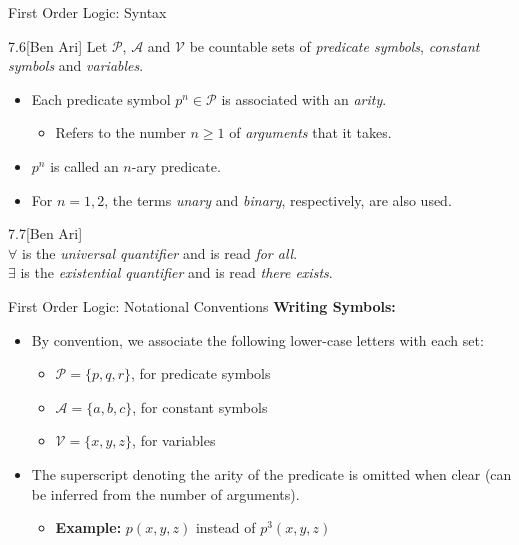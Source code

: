 \begin{slide}[bm=,toc=]{First Order Logic: Syntax}
\begin{defn}{7.6}[Ben Ari]
Let $\mathcal{P}$, $\mathcal{A}$ and $\mathcal{V}$ be countable sets of
\emph{predicate symbols}, \emph{constant symbols} and \emph{variables}.
\pause
\begin{itemize}
\item Each predicate symbol $p^n \in \mathcal{P}$ is associated with an \emph{arity}.
\begin{itemize}
\item Refers to the number $n \geq 1$ of \emph{arguments} that it takes. 
\end{itemize}
\item $p^n$ is called an $n$-ary predicate. 
\item For $n = 1,2$, the terms \emph{unary} and \emph{binary},
respectively, are also used.
\end{itemize}
\end{defn}
\pause
\begin{defn}{7.7}[Ben Ari]
~\\
$\forall$ is the \emph{universal quantifier} and is read \emph{for all}.\\
$\exists$ is the \emph{existential quantifier} and is read \emph{there exists}.
\end{defn}

\end{slide}

\begin{slide}[bm=,toc=]{First Order Logic: Notational Conventions}
\textbf{Writing Symbols:}
\begin{itemize}
\item<2-> By convention, we associate the following lower-case letters with each
set:
\begin{itemize}
\item $\mathcal{P} = \{p,q,r\}$, for predicate symbols
\item $\mathcal{A} = \{a,b,c\}$, for constant symbols
\item $\mathcal{V} = \{x,y,z\}$, for variables
\end{itemize}
\item<3-> The superscript denoting the arity of the predicate is omitted when clear (can
    be inferred from the number of arguments).
\begin{itemize}
\item<4-> \textbf{Example:} \pause[4] $p(x,y,z)$ instead of $p^3(x,y,z)$
\end{itemize}
\end{itemize}
\end{slide}

